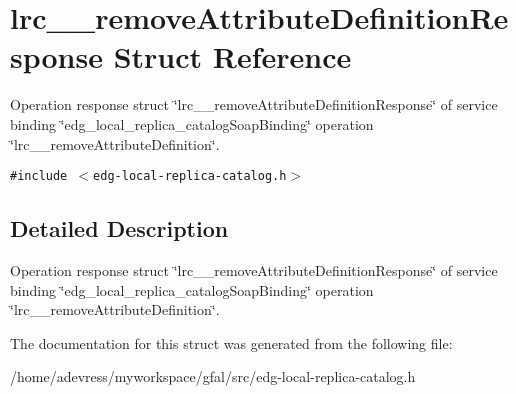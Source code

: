 \section{lrc\_\-\_\-remove\-Attribute\-Definition\-Response Struct Reference}
\label{structlrc____removeAttributeDefinitionResponse}
Operation response struct \char`\"{}lrc\_\-\_\-remove\-Attribute\-Definition\-Response\char`\"{} of service binding \char`\"{}edg\_\-local\_\-replica\_\-catalog\-Soap\-Binding\char`\"{} operation \char`\"{}lrc\_\-\_\-remove\-Attribute\-Definition\char`\"{}.  


{\tt \#include $<$edg-local-replica-catalog.h$>$}



\subsection{Detailed Description}
Operation response struct \char`\"{}lrc\_\-\_\-remove\-Attribute\-Definition\-Response\char`\"{} of service binding \char`\"{}edg\_\-local\_\-replica\_\-catalog\-Soap\-Binding\char`\"{} operation \char`\"{}lrc\_\-\_\-remove\-Attribute\-Definition\char`\"{}. 



The documentation for this struct was generated from the following file:\begin{CompactItemize}
\item 
/home/adevress/myworkspace/gfal/src/edg-local-replica-catalog.h\end{CompactItemize}
